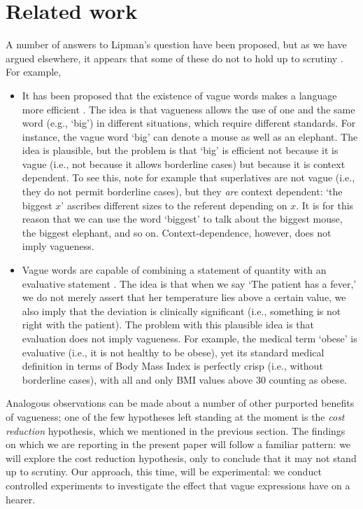 \documentclass[ %
  graybox       %
 ,envcountchap  %
 ,sectrefs      %
]{svmono}
\begin{document}
\section{Related work}\label{related-work}
A number of answers to Lipman's question have been proposed, but as we have argued elsewhere, it appears that some of these do not to hold up to scrutiny \citep{van2009utility,vanDeemterBook}. For example,
\begin{itemize}
\item It has been proposed that the existence of vague words makes a language more efficient \citep{barwiseperry}. The idea is that vagueness allows the use of one and the same word (e.g., `big') in different situations, which require different standards. For instance, the vague word `big' can denote a mouse as well as an elephant. The idea is plausible, but the problem is that `big' is efficient not because it is vague (i.e., not because it allows borderline cases) but because it is context dependent. To see this, note for example that superlatives are not vague (i.e., they do not permit borderline cases), but they {\em are} context dependent: `the biggest $x$' ascribes different sizes to the referent depending on $x$. It is for this reason that we can use the word `biggest'  to talk about the biggest mouse, the biggest elephant, and so on. Context-dependence, however, does not imply vagueness.
\item Vague words are capable of combining a statement of quantity with an evaluative statement \citep{veltman}. The idea is that when we say `The patient has a fever,' we do not merely assert that her temperature lies above a certain value, we also imply that the deviation is clinically significant (i.e., something is not right with the patient). The problem with this plausible idea is that evaluation does not imply vagueness. For example, the medical term `obese' is evaluative (i.e., it is not healthy to be obese), yet its standard medical definition in terms of Body Mass Index is perfectly crisp (i.e., without borderline cases), with all and only BMI values above 30 counting as obese.
\end{itemize}
Analogous observations can be made about a number of other purported benefits of vagueness; one of the few hypotheses left standing at the moment is the {\em cost reduction} hypothesis, which we mentioned in the previous section. The findings on which we are reporting in the present paper will follow a familiar pattern: we will explore the cost reduction hypothesis, only to conclude that it may not stand up to scrutiny. Our approach, this time, will be experimental: we conduct controlled experiments to investigate the effect that vague expressions have on a hearer.
\end{document}
